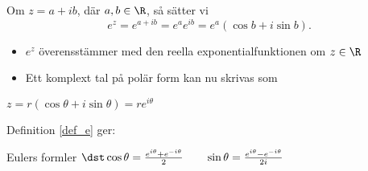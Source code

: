 \documentclass[slidestop,blue,handout,9pt]{beamer}
\begin{document}
\begin{frame}
\begin{definition}
\label{def_e}
Om $z=a+ib$, där $a,b\in\R$, så sätter vi 
\begin{equation*}
e^z = e^{a + ib} = e^ae^{ib} = e^a(\cos b + i\sin b).
\end{equation*}
\end{definition}
\begin{itemize}
\item $e^z$ överensstämmer med den reella exponentialfunktionen om $z\in \R$ 
\item Ett komplext tal på polär form kan nu skrivas som
\end{itemize}
\begin{center}
\begin{minipage}{0.35\linewidth}
\begin{block}{}
$z = r(\cos \theta + i\sin \theta) = re^{i\theta }$
\end{block}  
\end{minipage}
\end{center}


Definition \ref{def_e} ger: 
\begin{center}
\begin{minipage}{0.75\textwidth}
\begin{varblock}[0.75\textwidth]{Eulers formler}
$\dst\cos \theta = \frac{e^{i\theta } + e^{-i\theta }}{2} \qquad
\sin \theta = \frac{e^{i\theta } - e^{-i\theta }}{2i}$
\end{varblock}
\end{minipage}
\end{center}

\end{frame}
\end{document}
